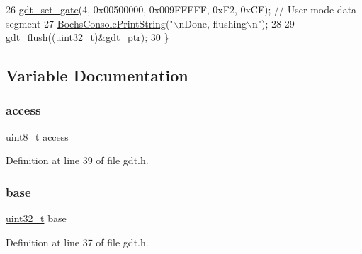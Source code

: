 \begin{DoxyCode}
26     \hyperlink{a00068_abcf0775ea602ace125ae809475b6d8bf_abcf0775ea602ace125ae809475b6d8bf}{gdt\_set\_gate}(4, 0x00500000, 0x009FFFFF, 0xF2, 0xCF); \textcolor{comment}{// User mode data segment}
27     \hyperlink{a00050_a19e1f554d03c977f8b947f21489daa41_a19e1f554d03c977f8b947f21489daa41}{BochsConsolePrintString}(\textcolor{stringliteral}{"\(\backslash\)nDone, flushing\(\backslash\)n"});
28 
29     \hyperlink{a00071_a62397fecbde23244b570ae632fe926fa_a62397fecbde23244b570ae632fe926fa}{gdt\_flush}((\hyperlink{a00104_a435d1572bf3f880d55459d9805097f62_a435d1572bf3f880d55459d9805097f62}{uint32\_t})&\hyperlink{a00071_ab0888c07dfb9352ef76d05e63464cf0b_ab0888c07dfb9352ef76d05e63464cf0b}{gdt\_ptr});
30 \}
\end{DoxyCode}


\subsection{Variable Documentation}
\mbox{\label{a00071_a8b0d6200bc639dd37ff68847a0adde5f_a8b0d6200bc639dd37ff68847a0adde5f}} 
\subsubsection{\texorpdfstring{access}{access}}
{\footnotesize\ttfamily \hyperlink{a00104_aba7bc1797add20fe3efdf37ced1182c5_aba7bc1797add20fe3efdf37ced1182c5}{uint8\+\_\+t} access}



Definition at line 39 of file gdt.\+h.

\mbox{\label{a00071_a0523cedff47e2441fc198b7770ec5d3f_a0523cedff47e2441fc198b7770ec5d3f}} 
\subsubsection{\texorpdfstring{base}{base}}
{\footnotesize\ttfamily \hyperlink{a00104_a435d1572bf3f880d55459d9805097f62_a435d1572bf3f880d55459d9805097f62}{uint32\+\_\+t} base}



Definition at line 37 of file gdt.\+h.

\mbox{\label{a00071_a1a173457c7aa39c59c008fcc3332d2b3_a1a173457c7aa39c59c008fcc3332d2b3}} 
